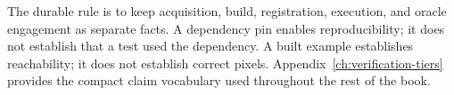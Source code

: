 The durable rule is to keep acquisition, build, registration, execution, and oracle engagement as
separate facts.  A dependency pin enables reproducibility; it does not establish that a test used
the dependency.  A built example establishes reachability; it does not establish correct pixels.
Appendix~\ref{ch:verification-tiers} provides the compact claim vocabulary used throughout the rest
of the book.
